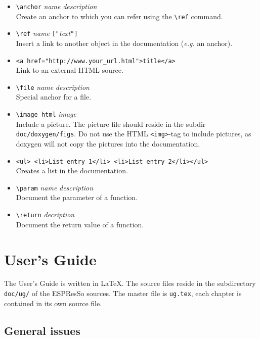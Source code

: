 \documentclass[
a4paper,                        %
11pt,                           %
twoside,                        %
footsepline,                    %
headsepline,                    %
headexclude,                    %
footexclude,                    %
pagesize,                       %
bibtotocnumbered,               %
idxtotoc                        %
]{scrartcl}
\newcommand{\es}{\mbox{\textsf{ESPResSo}}\xspace}
\newcommand{\eg}{\textit{e.g.}\xspace}
\begin{document}
\begin{itemize}
\item \verb!\anchor! \textit{name} \textit{description}\\
  Create an anchor to which you can refer using the \verb!\ref!
  command.
\item \verb!\ref! \textit{name} \texttt{["}\textit{text}\texttt{"]}\\
  Insert a link to another object in the documentation (\eg an
  anchor).
\item \verb!<a href="http://www.your_url.html">title</a>!\\
  Link to an external HTML source.
\item \verb!\file! \textit{name} \textit{description}\\
  Special anchor for a file.
\item \verb!\image html! \textit{image}\\
  Include a picture. The picture file should reside in the subdir
  \verb!doc/doxygen/figs!. Do not use the HTML \verb!<img>!-tag to
  include pictures, as doxygen will not copy the pictures into the
  documentation.
\item \verb!<ul> <li>List entry 1</li> <li>List entry 2</li></ul>!\\
  Creates a list in the documentation.
\item \verb!\param! \textit{name} \textit{description}\\
  Document the parameter of a function.
\item \verb!\return! \textit{decription}\\
  Document the return value of a function.
\end{itemize}

\section{User's Guide}

The User's Guide is written in \LaTeX. The source files reside in the
subdirectory \texttt{doc/ug/} of the \es sources. The master file is
\texttt{ug.tex}, each chapter is contained in its own source file.

\subsection{General issues}
\end{document}
